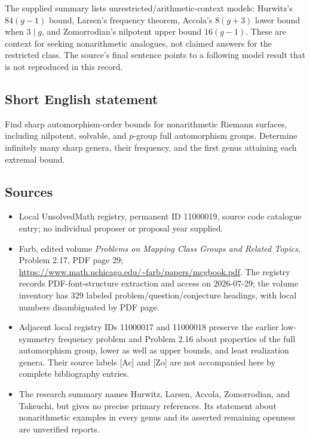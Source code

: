 \documentclass[11pt]{article}
\begin{document}
The supplied summary lists unrestricted/arithmetic-context models: Hurwitz's $84(g-1)$ bound, Larsen's frequency theorem, Accola's $8(g+3)$ lower bound when $3\mid g$, and Zomorrodian's nilpotent upper bound $16(g-1)$. These are context for seeking nonarithmetic analogues, not claimed answers for the restricted class. The source's final sentence points to a following model result that is not reproduced in this record.
\subsection{Short English statement}
Find sharp automorphism-order bounds for nonarithmetic Riemann surfaces, including nilpotent, solvable, and $p$-group full automorphism groups. Determine infinitely many sharp genera, their frequency, and the first genus attaining each extremal bound.
\subsection{Sources}
\begin{itemize}
\item Local UnsolvedMath registry, permanent ID 11000019, source code catalogue entry; no individual proposer or proposal year supplied.
\item Farb, edited volume \emph{Problems on Mapping Class Groups and Related Topics}, Problem 2.17, PDF page 29; \url{https://www.math.uchicago.edu/~farb/papers/mcgbook.pdf}. The registry records PDF-font-structure extraction and access on 2026-07-29; the volume inventory has 329 labeled problem/question/conjecture headings, with local numbers disambiguated by PDF page.
\item Adjacent local registry IDs 11000017 and 11000018 preserve the earlier low-symmetry frequency problem and Problem 2.16 about properties of the full automorphism group, lower as well as upper bounds, and least realization genera. Their source labels [Ac] and [Zo] are not accompanied here by complete bibliography entries.
\item The research summary names Hurwitz, Larsen, Accola, Zomorrodian, and Takeuchi, but gives no precise primary references. Its statement about nonarithmetic examples in every genus and its asserted remaining openness are unverified reports.
\end{itemize}
\end{document}
